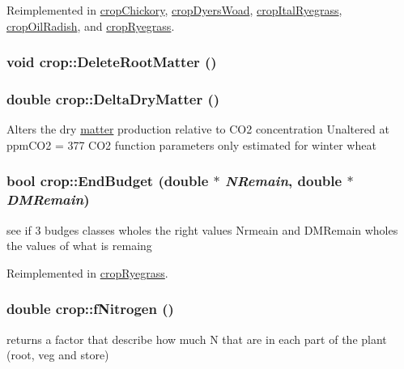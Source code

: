 Reimplemented in \hyperlink{classcrop_chickory_ad29787a097e6f6239285473a1b5c85ad}{cropChickory}, \hyperlink{classcrop_dyers_woad_a88209c73370f84f4e7f46ab28e6a2097}{cropDyersWoad}, \hyperlink{classcrop_ital_ryegrass_a0cf33f1022b9cbc023df110f68cac622}{cropItalRyegrass}, \hyperlink{classcrop_oil_radish_a3e3ded25f3277d7b8b24fb70900f5138}{cropOilRadish}, and \hyperlink{classcrop_ryegrass_a35e69a6dea6f87f1adb3060e456290ba}{cropRyegrass}.\hypertarget{classcrop_a0e65f8e17a7a00d9c4273a12d62c46d6}{
\subsubsection[{DeleteRootMatter}]{\setlength{\rightskip}{0pt plus 5cm}void crop::DeleteRootMatter ()}}
\label{classcrop_a0e65f8e17a7a00d9c4273a12d62c46d6}
\hypertarget{classcrop_a2dbc56666f949042e5d0c80dbbd66325}{
\subsubsection[{DeltaDryMatter}]{\setlength{\rightskip}{0pt plus 5cm}double crop::DeltaDryMatter ()}}
\label{classcrop_a2dbc56666f949042e5d0c80dbbd66325}
Alters the dry \hyperlink{classmatter}{matter} production relative to CO2 concentration Unaltered at ppmCO2 = 377 CO2 function parameters only estimated for winter wheat \hypertarget{classcrop_aaacb9f08e608ce328d60a25813a49ca5}{
\subsubsection[{EndBudget}]{\setlength{\rightskip}{0pt plus 5cm}bool crop::EndBudget (double $\ast$ {\em NRemain}, \/  double $\ast$ {\em DMRemain})}}
\label{classcrop_aaacb9f08e608ce328d60a25813a49ca5}
see if 3 budges classes wholes the right values Nrmeain and DMRemain wholes the values of what is remaing 

Reimplemented in \hyperlink{classcrop_ryegrass_a5bb3f7b2ad5805e527bea21bbb71531c}{cropRyegrass}.\hypertarget{classcrop_a602622ac2c0de6432e6b9438dbbb646b}{
\subsubsection[{fNitrogen}]{\setlength{\rightskip}{0pt plus 5cm}double crop::fNitrogen ()}}
\label{classcrop_a602622ac2c0de6432e6b9438dbbb646b}
returns a factor that describe how much N that are in each part of the plant (root, veg and store) 

